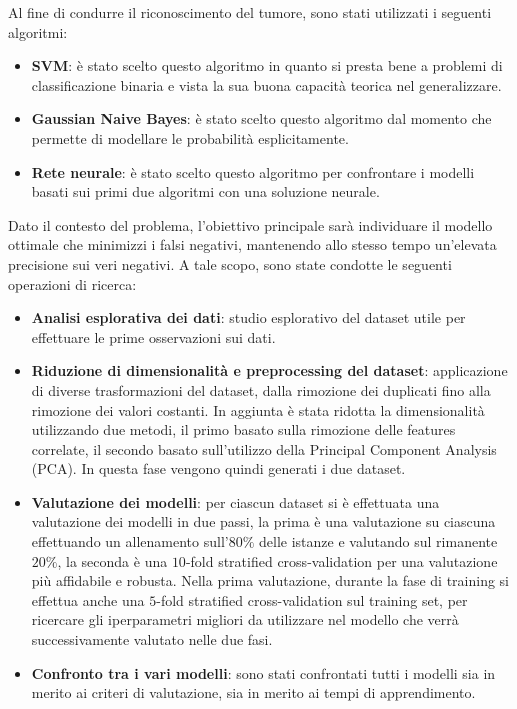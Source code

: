 Al fine di condurre il riconoscimento del tumore, sono stati utilizzati i
seguenti algoritmi:
\begin{itemize}
      \item \textbf{SVM}: è stato scelto questo algoritmo in quanto si presta bene
            a problemi di classificazione binaria e vista la sua buona capacità
            teorica nel generalizzare.
      \item \textbf{Gaussian Naive Bayes}: è stato scelto questo algoritmo dal
            momento che permette di modellare le probabilità esplicitamente.
      \item \textbf{Rete neurale}: è stato scelto questo algoritmo per confrontare
            i modelli basati sui primi due algoritmi con una soluzione neurale.
\end{itemize}
Dato il contesto del problema, l'obiettivo principale sarà individuare il modello
ottimale che minimizzi i falsi negativi, mantenendo allo stesso tempo un'elevata
precisione sui veri negativi. A tale scopo, sono state condotte le seguenti
operazioni di ricerca:
\begin{itemize}
      \item \textbf{Analisi esplorativa dei dati}: studio esplorativo del dataset
            utile per effettuare le prime osservazioni sui dati.
      \item \textbf{Riduzione di dimensionalità e preprocessing del dataset}:
            applicazione di diverse trasformazioni del dataset, dalla rimozione
            dei duplicati fino alla rimozione dei valori costanti. In aggiunta è
            stata ridotta la dimensionalità utilizzando due metodi, il primo
            basato sulla rimozione delle features correlate, il secondo basato
            sull'utilizzo della Principal Component Analysis (PCA). In questa fase
            vengono quindi generati i due dataset.
      \item \textbf{Valutazione dei modelli}: per ciascun dataset si è effettuata
            una valutazione dei modelli in due passi, la prima è una valutazione
            su ciascuna effettuando un allenamento sull'$80\%$ delle istanze e
            valutando sul rimanente $20\%$, la seconda è una $10$-fold stratified
            cross-validation per una valutazione più affidabile e robusta.
            Nella prima valutazione, durante la fase di training si effettua anche
            una $5$-fold stratified cross-validation sul training set, per
            ricercare gli iperparametri migliori da utilizzare nel modello che
            verrà successivamente valutato nelle due fasi.
      \item \textbf{Confronto tra i vari modelli}: sono stati confrontati tutti
            i modelli sia in merito ai criteri di valutazione, sia in merito ai
            tempi di apprendimento.
\end{itemize}
